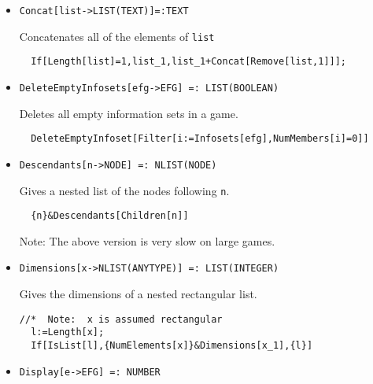 \begin{itemize}
\item{}
\protect \large \begin{verbatim}
Concat[list->LIST(TEXT)]=:TEXT
\end{verbatim}\normalsize

\bd 
Concatenates all of the elements of \verb+list+
\begin{verbatim}
  If[Length[list]=1,list_1,list_1+Concat[Remove[list,1]]];
\end{verbatim} 
\ed



\item{}
\protect \large \begin{verbatim}
DeleteEmptyInfosets[efg->EFG] =: LIST(BOOLEAN) 
\end{verbatim}\normalsize

\bd 
Deletes all empty information sets in a game.  
\begin{verbatim}
  DeleteEmptyInfoset[Filter[i:=Infosets[efg],NumMembers[i]=0]]
\end{verbatim} 
\ed

\item{}
\protect \large \begin{verbatim}
Descendants[n->NODE] =: NLIST(NODE) 
\end{verbatim}\normalsize

\bd 
Gives a nested list of the nodes following \verb+n+.
\begin{verbatim}
  {n}&Descendants[Children[n]]
\end{verbatim} 
\item[Note:] The above version is very slow on large games.
\ed

\item{}
\protect \large \begin{verbatim}
Dimensions[x->NLIST(ANYTYPE)] =: LIST(INTEGER) 
\end{verbatim}\normalsize

\bd 
Gives the dimensions of a nested rectangular list. 
\begin{verbatim}
//*  Note:  x is assumed rectangular
  l:=Length[x];
  If[IsList[l],{NumElements[x]}&Dimensions[x_1],{l}]
\end{verbatim} 
\ed


\item{}
\protect \large \begin{verbatim}
Display[e->EFG] =: NUMBER 
\end{verbatim}\normalsize


\end{itemize}
